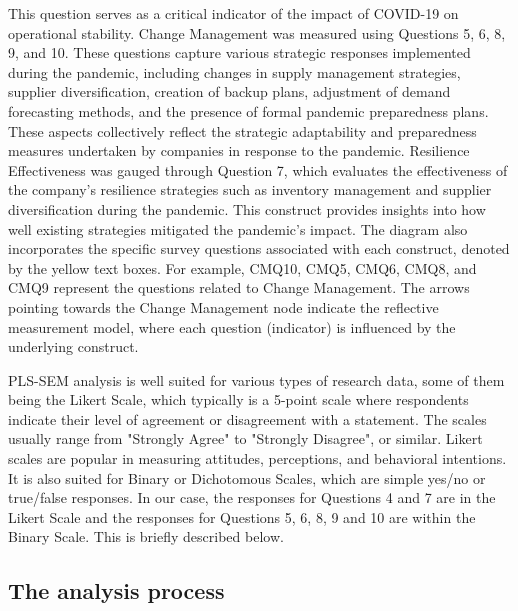 This question serves as a critical indicator of the impact of COVID-19 on operational stability. Change Management was measured using Questions 5, 6, 8, 9, and 10. These questions capture various strategic responses implemented during the pandemic, including changes in supply management strategies, supplier diversification, creation of backup plans, adjustment of demand forecasting methods, and the presence of formal pandemic preparedness plans. These aspects collectively reflect the strategic adaptability and preparedness measures undertaken by companies in response to the pandemic. Resilience Effectiveness was gauged through Question 7, which evaluates the effectiveness of the company's resilience strategies such as inventory management and supplier diversification during the pandemic. This construct provides insights into how well existing strategies mitigated the pandemic's impact. The diagram also incorporates the specific survey questions associated with each construct, denoted by the yellow text boxes. For example, CMQ10, CMQ5, CMQ6, CMQ8, and CMQ9 represent the questions related to Change Management. The arrows pointing towards the Change Management node indicate the reflective measurement model, where each question (indicator) is influenced by the underlying construct. 

PLS-SEM analysis is well suited for various types of research data, some of them being the Likert Scale, which typically is a 5-point scale where respondents indicate their level of agreement or disagreement with a statement. The scales usually range from "Strongly Agree" to "Strongly Disagree", or similar. Likert scales are popular in measuring attitudes, perceptions, and behavioral intentions. It is also suited for Binary or Dichotomous Scales, which are simple yes/no or true/false responses. In our case, the responses for Questions 4 and 7 are in the Likert Scale and the responses for Questions 5, 6, 8, 9 and 10 are within the Binary Scale. This is briefly described below.

\subsection{The analysis process}

